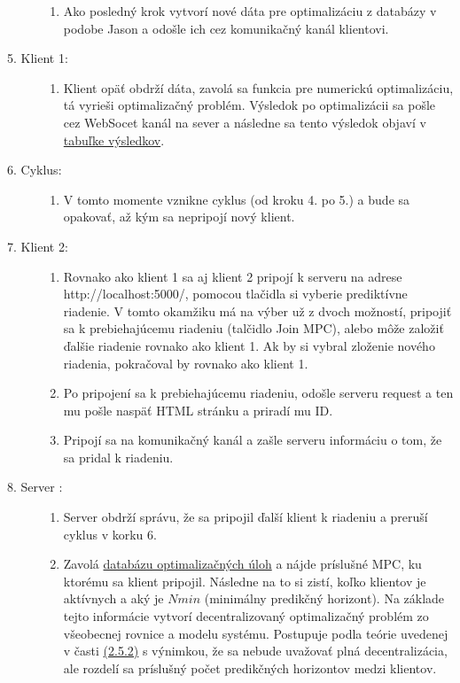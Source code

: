 \begin{description}
{\begin{enumerate}
{}
\item{
Ako posledný krok vytvorí nové dáta pre optimalizáciu z databázy v podobe Jason a odošle ich cez komunikačný kanál klientovi.
}
\end{enumerate}
}
\item[5. Klient 1:]{\hfill
	\begin{enumerate}
		\item{Klient opäť obdrží dáta, zavolá sa funkcia pre numerickú optimalizáciu, tá vyrieši optimalizačný problém. Výsledok po optimalizácii sa pošle cez WebSocet kanál na sever a následne sa tento výsledok objaví v \hyperref[fig:Tabulka]{tabuľke výsledkov}.}
	\end{enumerate}
}
\item[6. Cyklus:]{\hfill
	\begin{enumerate}
		\item{V tomto momente vznikne cyklus (od kroku 4. po 5.) a bude sa opakovať, až kým sa nepripojí nový klient.}
	\end{enumerate}
}
\item[7. Klient 2:]{\hfill
	\begin{enumerate}
		\item{Rovnako ako klient 1 sa aj klient 2 pripojí k serveru na adrese http://localhost:5000/,  pomocou tlačidla si vyberie prediktívne riadenie. V tomto okamžiku má na výber už z dvoch možností, pripojiť sa k prebiehajúcemu riadeniu (talčidlo Join MPC), alebo môže založiť ďalšie riadenie rovnako ako klient 1. Ak by si vybral zloženie nového riadenia, pokračoval by rovnako ako klient 1.}
		\item{
			Po pripojení sa k prebiehajúcemu riadeniu, odošle serveru request a ten mu pošle naspäť HTML stránku a priradí mu ID.
		}
		\item{ 
			Pripojí sa na komunikačný kanál a zašle serveru informáciu o tom, že sa pridal k riadeniu. 
		}
	\end{enumerate}
}
\item[8. Server :]{\hfill
	\begin{enumerate}
		\item{
			Server obdrží správu, že sa pripojil ďalší klient k riadeniu a preruší cyklus v korku 6.
		}
		\item{
			Zavolá \hyperref[DB:OPT]{databázu optimalizačných úloh} a nájde príslušné MPC, ku ktorému sa klient pripojil. Následne na to si zistí, koľko klientov je aktívnych a aký je $Nmin$ (minimálny predikčný horizont). Na základe tejto informácie vytvorí decentralizovaný optimalizačný problém zo všeobecnej rovnice a modelu systému. Postupuje podla teórie uvedenej v časti \hyperref[subse:Nelin_MPC_ADMM]{(2.5.2)} s výnimkou, že sa nebude uvažovať plná decentralizácia, ale rozdelí sa príslušný počet predikčných horizontov medzi klientov.
}
\end{enumerate}}
\end{description}
